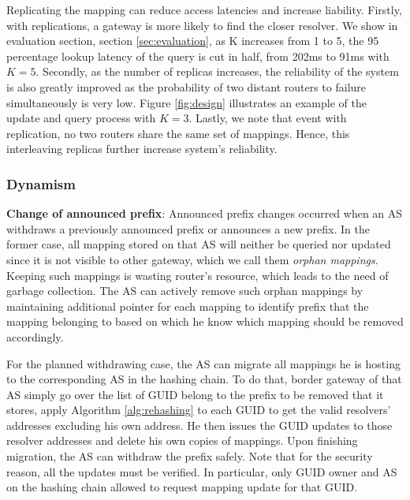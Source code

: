         Replicating the mapping can reduce access latencies and increase liability. Firstly, with replications, a gateway is more likely to find the closer resolver. We show in evaluation section, section \ref{sec:evaluation}, as K increases from 1 to 5, the 95 percentage lookup latency of the query is cut in half, from 202ms to 91ms with $K=5$. Secondly, as the number of replicas increases, the reliability of the system is also greatly improved as the probability of two distant routers to failure simultaneously is very low. Figure \ref{fig:design} illustrates an example of the update and query process with $K=3$. Lastly, we note that event with replication, no two routers share the same set of mappings. Hence, this interleaving replicas further increase system's reliability.
        \subsubsection{Dynamism}
        \textbf{Change of announced prefix}:  Announced prefix changes occurred when an AS withdraws a previously announced prefix or announces a new prefix. In the former case, all mapping stored on that AS will neither be queried nor updated since it is not visible to other gateway, which we call them \emph{orphan mappings}. Keeping such mappings is wasting router's resource, which leads to the need of garbage collection. The AS can actively remove such orphan mappings by maintaining additional pointer for each mapping to identify prefix that the mapping belonging to based on which he know which mapping should be removed accordingly.

        For the planned withdrawing case, the AS can migrate all mappings he is hosting to the corresponding AS in the hashing chain. To do that, border gateway of that AS simply go over the list of GUID belong to the prefix to be removed that it stores, apply Algorithm \ref{alg:rehashing} to each GUID to get the valid resolvers' addresses excluding his own address. He then issues the GUID updates to those resolver addresses and delete his own copies of mappings. Upon finishing migration, the AS can withdraw the prefix safely. Note that for the security reason, all the updates must be verified. In particular, only GUID owner and AS on the hashing chain allowed to request mapping update for that GUID.


